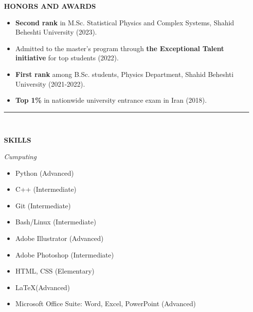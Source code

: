 \documentclass[11pt, b4paper]{cv}
\begin{document}
\textbf{HONORS AND AWARDS}
\vspace{-0.10in}

\begin{itemize}
    \item \textbf{Second rank} in M.Sc. Statistical Physics and Complex Systems, Shahid Beheshti University (2023).
	\item Admitted to the master’s program through \textbf{the Exceptional Talent initiative} for top students (2022).
	\item \textbf{First rank} among B.Sc. students, Physics Department, Shahid Beheshti University (2021-2022).
    \item \textbf{Top 1\%} in nationwide university entrance exam in Iran (2018).
\end{itemize}


\vspace{-0.15in}
\rule{\textwidth}{1pt}\\
\vspace{-0.15in}

\textbf{SKILLS}


\textit{Cumputing}
\vspace{-0.1in}

\begin{multicols}{3}[]
	\begin{itemize}
	\setlength\itemsep{-0.5pt}
	  \item  Python (Advanced)
	  \item  C++ (Intermediate)
	  \item  Git (Intermediate)
	  \item  Bash/Linux (Intermediate)
	  \item  Adobe Illustrator (Advanced)
	  \item  Adobe Photoshop (Intermediate)
	  \item  HTML, CSS (Elementary)
	  \item  \LaTeX  (Advanced)
	  \item  Microsoft Office Suite: Word, Excel, PowerPoint (Advanced)
	\end{itemize}
\end{multicols}
\end{document}
